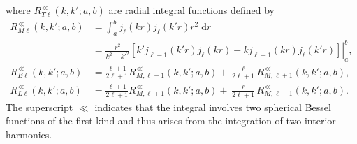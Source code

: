 where $R_{T\ell}^\ll(k,k';a,b)$ are radial integral functions defined by
\begin{equation}\label{eq:finiteRadialIntegrals}
\begin{split}
R_{M\ell}^\ll(k,k';a,b) &= \int_a^bj_\ell(kr)j_\ell(k'r)r^2\;\mathrm{d}r\\
&= \left.\frac{r^2}{k^2 - k'^2}\left[k'j_{\ell - 1}(k'r)j_\ell(kr) - kj_{\ell - 1}(kr)j_\ell(k'r)\right]\right|_a^b,\\[0.5em]
R_{E\ell}^\ll(k,k';a,b) &= \frac{\ell + 1}{2\ell + 1}R_{M,\ell - 1}^\ll(k,k';a,b) + \frac{\ell}{2\ell + 1}R_{M,\ell + 1}^\ll(k,k';a,b),\\
R_{L\ell}^\ll(k,k';a,b) &= \frac{\ell + 1}{2\ell + 1}R_{M,\ell + 1}^\ll(k,k';a,b) + \frac{\ell}{2\ell + 1}R_{M,\ell - 1}^\ll(k,k';a,b).
\end{split}
\end{equation}
The superscript $\ll$ indicates that the integral involves two spherical Bessel functions of the first kind and thus arises from the integration of two interior harmonics. 

